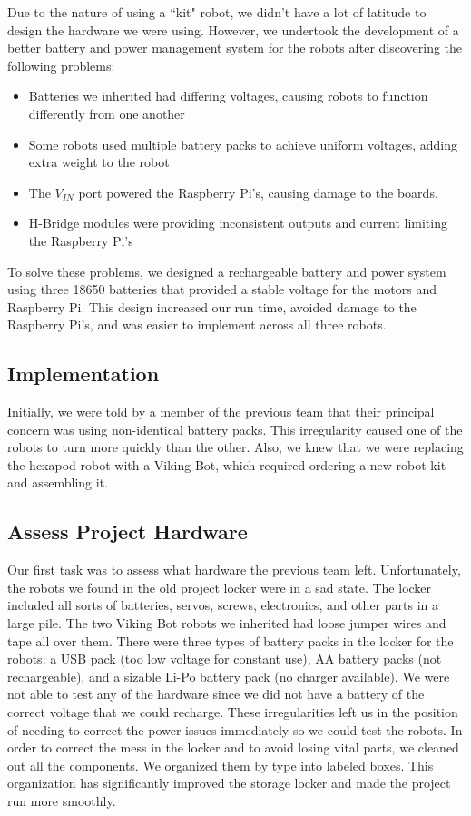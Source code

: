 \documentclass[a4paper,12pt]{article}
\begin{document}
	Due to the nature of using a ``kit" robot, we didn’t have a lot of latitude to design the hardware we were using. However, we undertook the development of a better battery and power management system for the robots after discovering the following problems:

	\begin{itemize}
		\item Batteries we inherited had differing voltages, causing robots to function differently from one another
		\item Some robots used multiple battery packs to achieve uniform voltages, adding extra weight to the robot
		\item The $V_{IN}$ port powered the Raspberry Pi's, causing damage to the boards.
		\item H-Bridge modules were providing inconsistent outputs and current limiting the Raspberry Pi's
	\end{itemize}
	
	To solve these problems, we designed a rechargeable battery and power system using three 18650 batteries that provided a stable voltage for the motors and Raspberry Pi. This design increased our run time, avoided damage to the Raspberry Pi's, and was easier to implement across all three robots.
	
\subsection{Implementation}
	Initially, we were told by a member of the previous team that their principal concern was using non-identical battery packs. This irregularity caused one of the robots to turn more quickly than the other. Also, we knew that we were replacing the hexapod robot with a Viking Bot, which required ordering a new robot kit and assembling it.

\subsection{Assess Project Hardware}
	Our first task was to assess what hardware the previous team left. Unfortunately, the robots we found in the old project locker were in a sad state. The locker included all sorts of batteries, servos, screws, electronics, and other parts in a large pile. The two Viking Bot robots we inherited had loose jumper wires and tape all over them. There were three types of battery packs in the locker for the robots: a USB pack (too low voltage for constant use), AA battery packs (not rechargeable), and a sizable Li-Po battery pack (no charger available). We were not able to test any of the hardware since we did not have a battery of the correct voltage that we could recharge. These irregularities left us in the position of needing to correct the power issues immediately so we could test the robots. In order to correct the mess in the locker and to avoid losing vital parts, we cleaned out all the components. We organized them by type into labeled boxes. This organization has significantly improved the storage locker and made the project run more smoothly.
	
\end{document}
